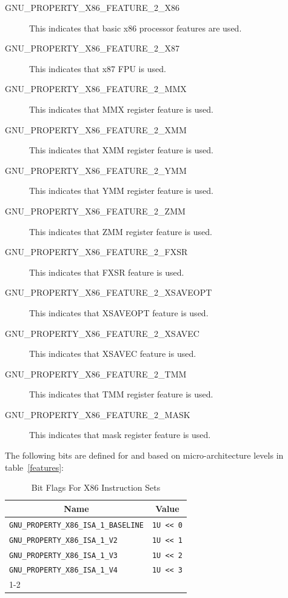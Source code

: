 \begin{description}
 \item[GNU_PROPERTY_X86_FEATURE_2_X86] This indicates that basic x86
   processor features are used.
 \item[GNU_PROPERTY_X86_FEATURE_2_X87] This indicates that x87 FPU is
   used.
 \item[GNU_PROPERTY_X86_FEATURE_2_MMX] This indicates that MMX register
   feature is used.
 \item[GNU_PROPERTY_X86_FEATURE_2_XMM] This indicates that XMM register
   feature is used.
 \item[GNU_PROPERTY_X86_FEATURE_2_YMM] This indicates that YMM register
   feature is used.
 \item[GNU_PROPERTY_X86_FEATURE_2_ZMM] This indicates that ZMM register
   feature is used.
 \item[GNU_PROPERTY_X86_FEATURE_2_FXSR] This indicates that FXSR feature
   is used.
 \item[GNU_PROPERTY_X86_FEATURE_2_XSAVEOPT] This indicates that XSAVEOPT
   feature is used.
 \item[GNU_PROPERTY_X86_FEATURE_2_XSAVEC] This indicates that XSAVEC
   feature is used.
 \item[GNU_PROPERTY_X86_FEATURE_2_TMM] This indicates that TMM register
   feature is used.
 \item[GNU_PROPERTY_X86_FEATURE_2_MASK] This indicates that mask register
   feature is used.
\end{description}

The following bits are defined for 
and  based on micro-architecture levels
in table~\ref{features}:

\begin{table}[H]
\Hrule
  \caption{Bit Flags For X86 Instruction Sets}
  \begin{center}
    \begin{tabular}[t]{l|l}
      \multicolumn{1}{c}{Name} & \multicolumn{1}{c}{Value} \\
      \hline
     \texttt{GNU_PROPERTY_X86_ISA_1_BASELINE} & \texttt{1U << 0} \\
     \texttt{GNU_PROPERTY_X86_ISA_1_V2} & \texttt{1U << 1} \\
     \texttt{GNU_PROPERTY_X86_ISA_1_V3} & \texttt{1U << 2} \\
     \texttt{GNU_PROPERTY_X86_ISA_1_V4} & \texttt{1U << 3} \\
    \cline{1-2}
    \end{tabular}
  \end{center}
\end{table}

